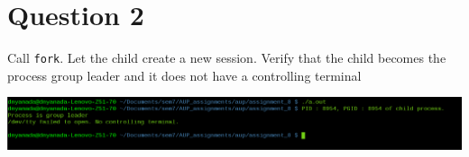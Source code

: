 \documentclass[main.tex]{subfiles}
\begin{document}
\section{Question 2}
Call \texttt{fork}. Let the child create a new session. Verify that the child becomes the
process group leader and it does not have a controlling terminal


\includegraphics[width=\textwidth]{figures/2_output.png}
\end{document}

